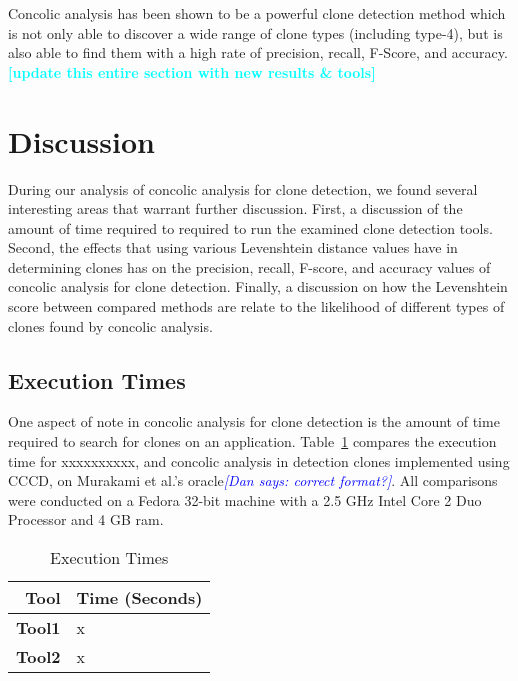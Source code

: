 \documentclass[smallextended]{svjour3}       %
\newcommand{\todo}[1]{\textcolor{cyan}{\textbf{[#1]}}}
\newcommand{\dan}[1]{\textcolor{blue}{{\it [Dan says: #1]}}}
\begin{document}
Concolic analysis has been shown to be a powerful clone detection method which is not only able to discover a wide range of clone types (including type-4), but is also able to find them with a high rate of precision, recall, F-Score, and accuracy.
\todo{update this entire section with new results \& tools}


\section{Discussion}
\label{sec: discussion}

During our analysis of concolic analysis for clone detection, we found several interesting areas that warrant further discussion. First, a discussion of the amount of time required to required to run the examined clone detection tools. Second, the effects that using various Levenshtein distance values have in determining clones has on the precision, recall, F-score, and accuracy values of concolic analysis for clone detection. Finally, a discussion on how the Levenshtein score between compared methods are relate to the likelihood of different types of clones found by concolic analysis.


\subsection{Execution Times}
One aspect of note in concolic analysis for clone detection is the amount of time required to search for clones on an application. Table~\ref{table:executiontimes} compares the execution time for xxxxxxxxxx, and concolic analysis in detection clones implemented using CCCD, on Murakami et al.'s oracle\dan{correct format?}. All comparisons were conducted on a Fedora 32-bit machine with a 2.5 GHz Intel Core 2 Duo Processor and 4 GB ram.

\begin{table}[thb!]

\begin{center}
\caption{Execution Times}
\label{table:executiontimes}
\begin{tabular}{r||l}
\bfseries Tool & \bfseries Time (Seconds)  \\ \hline\hline
 \bfseries  Tool1  & x \\
  \hline
\bfseries  Tool2  & x \\

\end{tabular}
\end{center}

\end{table}
\end{document}
